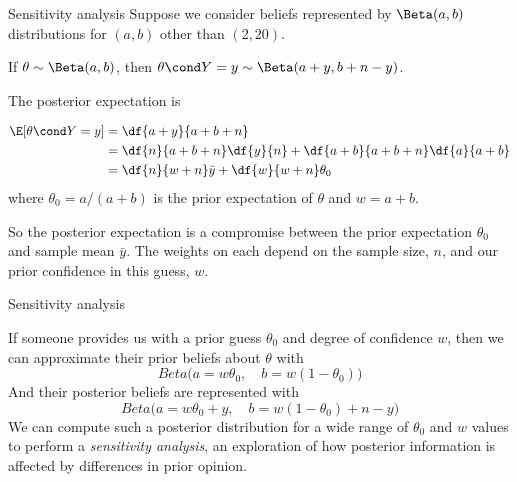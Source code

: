 \documentclass[10pt]{beamer}
\begin{document}
\begin{frame}{Sensitivity analysis}
Suppose we consider beliefs represented by $\Beta(a,b)$ distributions for $(a,b)$ other than $(2,20)$.   

If $\theta \sim \Beta(a,b)$,  then $\theta \cond Y=y \sim \Beta(a+y,  b+n-y)$.  

The posterior expectation is

\begin{align*}
\E[\theta \cond Y=y] &= \df{a+y}{a+b+n} \\
&= \df{n}{a+b+n} \df{y}{n} + \df{a+b}{a+b+n} \df{a}{a+b} \\
& = \df{n}{w+n}  \bar{y} + \df{w}{w+n} \theta_0 \\
\end{align*}
where $\theta_0 = a/(a+b)$ is the prior expectation of $\theta$ and $w=a+b$.
\pause 

So the posterior expectation is a compromise between the prior expectation $\theta_0$ and sample mean $\bar{y}$.  The weights on each depend on the sample size,  $n$,  and our prior confidence in this guess,  $w$. 
\end{frame}

\begin{frame}{Sensitivity analysis}

If someone provides us with a prior guess $\theta_0$ and degree of confidence $w$,  then we can approximate their prior beliefs about $\theta$ with
\[ Beta \bigg(  a = w \theta_0 ,  \quad  b= w (1-\theta_0) \bigg) \]
And their posterior beliefs are represented with 
\[ Beta \bigg(  a = w \theta_0 + y  ,  \quad  b= w (1-\theta_0) + n-y \bigg) \] 
\pause 
We can compute such a posterior distribution for a wide range of $\theta_0$ and $w$ values to perform a \textit{sensitivity analysis},  an exploration of how posterior information is affected by differences in prior opinion.


\end{frame}
\end{document}

